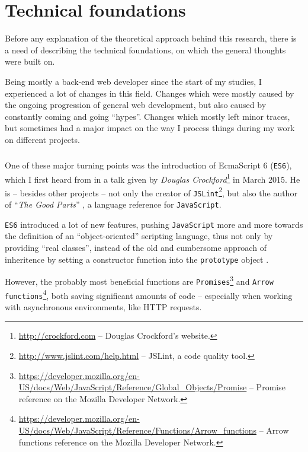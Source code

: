 \chapter{Technical foundations}
\label{cha:technicalfoundations}

Before any explanation of the theoretical approach behind this research, there is a need of describing the technical foundations, on which the general thoughts were built on.

Being mostly a back-end web developer since the start of my studies, I experienced a lot of changes in this field. Changes which were mostly caused by the ongoing progression of general web development, but also caused by constantly coming and going ``hypes''. Changes which mostly left minor traces, but sometimes had a major impact on the way I process things during my work on different projects.

\paragraph{} %
One of these major turning points was the introduction of EcmaScript 6 (\texttt{ES6}), which I first heard from in a talk given by \emph{Douglas Crockford}\footnote{\url{http://crockford.com} -- Douglas Crockford's website.} in March 2015. He is -- besides other projects -- not only the creator of \texttt{JSLint}\footnote{\url{http://www.jslint.com/help.html} -- JSLint, a code quality tool.}, but also the author of ``\emph{The Good Parts}'' \cite{crockford2008javascript}, a language reference for \texttt{JavaScript}.

\texttt{ES6} introduced a lot of new features, pushing \texttt{JavaScript} more and more towards the definition of an ``object-oriented'' scripting language, thus not only by providing ``real classes'', instead of the old and cumbersome approach of inheritence by setting a constructor function into the \texttt{prototype} object \cite[47]{crockford2008javascript}.

However, the probably most beneficial functions are \texttt{Promises}\footnote{\url{https://developer.mozilla.org/en-US/docs/Web/JavaScript/Reference/Global_Objects/Promise} -- Promise reference on the Mozilla Developer Network.} and \texttt{Arrow functions}\footnote{\url{https://developer.mozilla.org/en-US/docs/Web/JavaScript/Reference/Functions/Arrow_functions} -- Arrow functions reference on the Mozilla Developer Network.}, both saving significant amounts of code -- especially when working with asynchronous environments, like HTTP requests.

